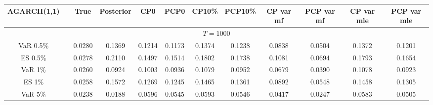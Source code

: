 { \tiny 
{ \renewcommand{\arraystretch}{1.1} 
\begin{sidewaystable} 
\center 
\begin{tabular}{cc cc | cccc | cccc} 
AGARCH(1,1) && True & Posterior & CP0  & PCP0 & CP10\%  & PCP10\% &CP var mf & PCP var mf & CP var mle & PCP var mle \\ \hline 
\hline 
\multicolumn{12}{c}{$T =1000$}  \\ 
\hline 
%
%
VaR 0.5\%
&& 0.0280 & 0.1369 & 0.1214 & 0.1173 & 0.1374 & 0.1238 &0.0838 & 0.0504 & 0.1372 & 0.1201 \\ 
ES 0.5\%
&& 0.0278 & 0.2110 & 0.1497 & 0.1514 & 0.1802 & 0.1738 &0.1081 & 0.0694 & 0.1793 & 0.1654 \\ 
\rowcolor{LightCyan} 
\rowcolor{LightCyan} 
VaR 1\% 
&& 0.0260 & 0.0924 & 0.1003 & 0.0936 & 0.1079 & 0.0952 &0.0679 & 0.0390 & 0.1078 & 0.0923 \\ 
\rowcolor{LightCyan} 
\rowcolor{LightCyan} 
\rowcolor{LightCyan} 
ES 1\%
&& 0.0258 & 0.1572 & 0.1269 & 0.1245 & 0.1465 & 0.1361 &0.0892 & 0.0548 & 0.1458 & 0.1305 \\ 
VaR 5\% 
&& 0.0238 & 0.0188 & 0.0596 & 0.0545 & 0.0593 & 0.0546 &0.0417 & 0.0247 & 0.0583 & 0.0505 \\ 

\end{tabular}
\end{sidewaystable}}}

